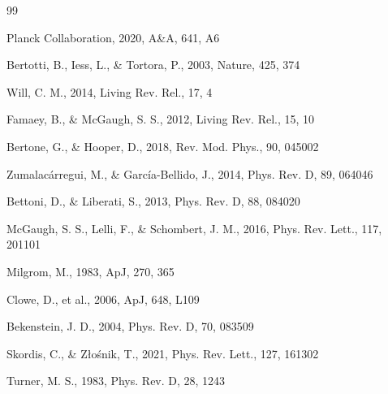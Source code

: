 \documentclass[twocolumn,amsmath,amssymb,floatfix]{article}
\begin{document}
\begin{thebibliography}{99}

Planck Collaboration, 2020, A\&A, 641, A6

Bertotti, B., Iess, L., \& Tortora, P., 2003, Nature, 425, 374

Will, C. M., 2014, Living Rev. Rel., 17, 4

Famaey, B., \& McGaugh, S. S., 2012, Living Rev. Rel., 15, 10

Bertone, G., \& Hooper, D., 2018, Rev. Mod. Phys., 90, 045002

Zumalac\'arregui, M., \& Garc\'ia-Bellido, J., 2014, Phys. Rev. D, 89, 064046

Bettoni, D., \& Liberati, S., 2013, Phys. Rev. D, 88, 084020

McGaugh, S. S., Lelli, F., \& Schombert, J. M., 2016, Phys. Rev. Lett., 117, 201101

Milgrom, M., 1983, ApJ, 270, 365

Clowe, D., et al., 2006, ApJ, 648, L109

Bekenstein, J. D., 2004, Phys. Rev. D, 70, 083509

Skordis, C., \& Z\l{}o\'snik, T., 2021, Phys. Rev. Lett., 127, 161302

Turner, M. S., 1983, Phys. Rev. D, 28, 1243

\end{thebibliography}
\end{document}
